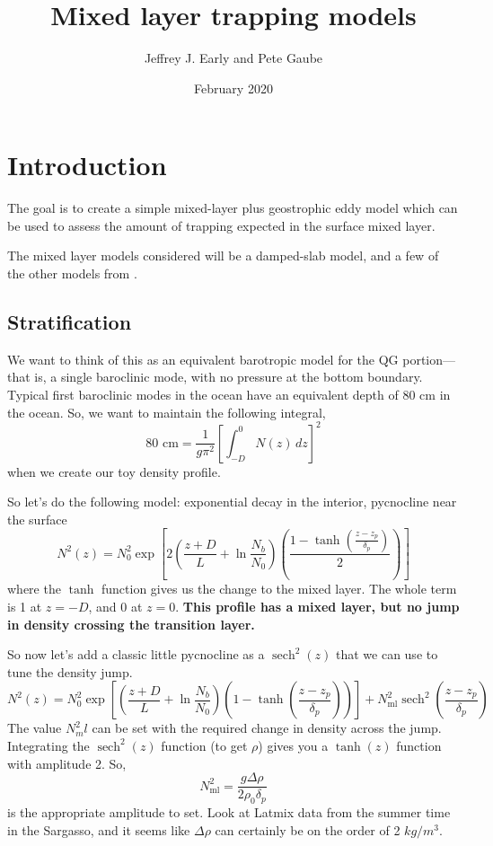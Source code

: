 \documentclass{article}
\title{Mixed layer trapping models}
\author{Jeffrey J. Early and Pete Gaube}
\date{February 2020}
\DeclareMathOperator{\sech}{sech}
\begin{document}
\maketitle

\section{Introduction}

The goal is to create a simple mixed-layer plus geostrophic eddy model which can be used to assess the amount of trapping expected in the surface mixed layer.

The mixed layer models considered will be a damped-slab model, and a few of the other models from \cite{elipot2009-os}.

%
\subsection{Stratification}
%
We want to think of this as an equivalent barotropic model for the QG portion---that is, a single baroclinic mode, with no pressure at the bottom boundary. Typical first baroclinic modes in the ocean have an equivalent depth of 80 cm in the ocean. So, we want to maintain the following integral,
\begin{equation}
    80 \textrm{ cm} = \frac{1}{g \pi^2} \left[ \int_{-D}^0 N(z) \, dz \right]^2
\end{equation}{}
when we create our toy density profile.

So let's do the following model: exponential decay in the interior, pycnocline near the surface
\begin{equation}
    N^2(z) = N_0^2 \exp \left[2 \left( \frac{z+D}{L} + \ln \frac{N_b}{N_0} \right)\left( \frac{1-\tanh\left(\frac{z-z_p}{\delta_p}\right)}{2} \right) \right]
\end{equation}{}
where the $\tanh$ function gives us the change to the mixed layer. The whole term is 1 at $z=-D$, and 0 at $z=0$. \textbf{This profile has a mixed layer, but no jump in density crossing the transition layer.}

So now let's add a classic little pycnocline as a $\sech^2(z)$ that we can use to tune the density jump.
\begin{equation}
    N^2(z) = N_0^2 \exp \left[ \left( \frac{z+D}{L} + \ln \frac{N_b}{N_0} \right)\left( 1-\tanh\left(\frac{z-z_p}{\delta_p}\right) \right) \right] + N_\textrm{ml}^2 \sech^2 \left(\frac{z-z_p}{\delta_p}\right)
\end{equation}{}
The value $N^2_ml$ can be set with the required change in density across the jump. Integrating the $\sech^2(z)$ function (to get $\rho$) gives you a $\tanh(z)$ function with amplitude 2. So,
\begin{equation}
    N_\textrm{ml}^2 = \frac{g \Delta \rho }{2 \rho_0 \delta_p}
\end{equation}{}
is the appropriate amplitude to set. Look at Latmix data from the summer time in the Sargasso, and it seems like $\Delta \rho$ can certainly be on the order of 2 $kg/m^3$.
\end{document}
